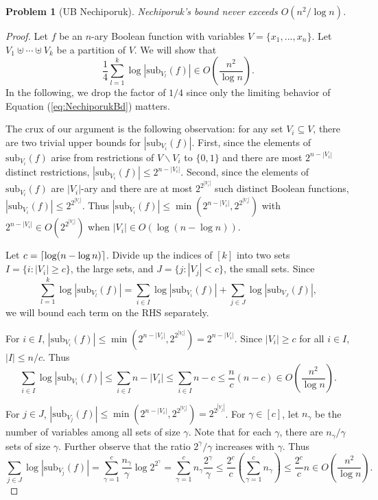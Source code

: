 \documentclass[11pt]{article}
\newcommand\sub{\mathrm{sub}}
\newtheorem{problem}{Problem}
\DeclarePairedDelimiter\ceil{\lceil}{\rceil}
\begin{document}
\vspace{1em}
\begin{problem}[UB Nechiporuk] Nechiporuk's bound never exceeds $O(n^2/\log n)$.
\end{problem}
\begin{proof}
	Let $f$ be an $n$-ary Boolean function with variables $V = \{x_1, ..., x_n\}$. Let $V_1 \uplus \cdots \uplus V_k$ be a partition of $V$. We will show that 
	\begin{equation}
		\label{eq:NechiporukBd}
		\frac{1}{4}\sum_{l = 1}^{k}\log|\sub_{V_l}(f)| \in O\left(\frac{n^2}{\log n}\right).
	\end{equation}
	In the following, we drop the factor of $1/4$ since only the limiting behavior of Equation (\ref{eq:NechiporukBd}) matters.
	
	The crux of our argument is the following observation: for any set $V_i \subseteq V$, there are two trivial upper bounds for $|\sub_{V_i}(f)|$. First, since the elements of $\sub_{V_i}(f)$ arise from restrictions of $V \backslash V_i$ to $\{0,1\}$ and there are most $2^{n - |V_i|}$ distinct restrictions, $|\sub_{V_i}(f)| \leq 2^{n- |V_i|}$. Second, since the elements of $\sub_{V_i}(f)$ are $|V_i|$-ary and there are at most $2^{2^{|V_i|}}$ such distinct Boolean functions, $|\sub_{V_i}(f)| \leq  2^{2^{|V_i|}}$. Thus $|\sub_{V_i}(f)| \leq \min\left(2^{n-|V_i|}, 2^{2^{|V_i|}}\right)$ with $2^{n - |V_i|} \in O\left(2^{2^{|V_i|}}\right)$ when $|V_i| \in O(\log(n - \log n))$.  
	
	Let $c = \ceil{\log(n - \log n)}$. Divide up the indices of $[k]$ into two sets $I = \{i: |V_i| \geq c\}$, the large sets, and $J = \{j: |V_j| < c\}$, the small sets. Since 
	\[\sum_{l=1}^{k}\log|\sub_{V_l}(f)| = \sum_{i\in I}\log|\sub_{V_i}(f)| + \sum_{j\in J}\log|\sub_{V_J}(f)|,\]
	we will bound each term on the RHS separately.
	
	For $i \in I$, $|\sub_{V_i}(f)| \leq \min\left(2^{n-|V_i|}, 2^{2^{|V_i|}}\right) = 2^{n-|V_i|}$. Since $|V_i| \geq c$ for all $i \in I$, $|I| \leq n/c$. Thus
	\begin{equation}
		\label{eq:BdLargeSets}
		\sum_{i\in I}\log|\sub_{V_i}(f)| \leq \sum_{i\in I} n - |V_i| \leq \sum_{i\in I} n - c \leq \frac{n}{c}\left(n - c\right) \in O\left(\frac{n^2}{\log n}\right).
	\end{equation}
		
	For $j \in J$, $|\sub_{V_j}(f)| \leq \min\left(2^{n-|V_i|}, 2^{2^{|V_i|}}\right) = 2^{2^{|V_j|}}$. For $\gamma \in [c]$, let $n_{\gamma}$ be the number of variables among all sets of size $\gamma$. Note that for each $\gamma$, there are $n_{\gamma}/\gamma$ sets of size $\gamma$. Further observe that the ratio $2^{\gamma}/\gamma$ increases with $\gamma$. Thus 
	\begin{equation}
		\label{eq:BdSmallSets}
		\sum_{j\in J}\log|\sub_{V_j}(f)| = \sum_{\gamma = 1}^{c}\frac{n_\gamma}{\gamma}\log2^{2^{\gamma}} = \sum_{\gamma = 1}^{c}n_\gamma\frac{2^{\gamma}}{\gamma} \leq \frac{2^{c}}{c}\left(\sum_{\gamma = 1}^{c}n_\gamma\right) \leq \frac{2^{c}}{c}n \in O\left(\frac{n^{2}}{\log n}\right).
	\end{equation}
	

\end{proof}
\end{document}
